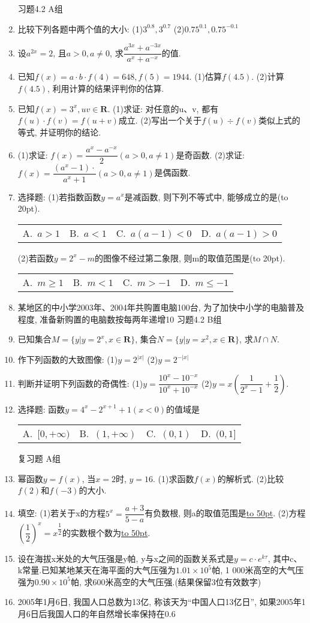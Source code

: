 \documentclass[10pt,a4paper]{article}
\newcommand{\blank}[1]{\underline{\hbox to #1pt{}}}
\newcommand{\bracket}[1]{(\hbox to #1pt{})}
\newcommand{\fourch}[4]{\par\begin{tabular}{p{.23\textwidth}p{.23\textwidth}p{.23\textwidth}p{.23\textwidth}}
A.~#1 &B.~#2& C.~#3& D.~#4
\end{tabular}}
\begin{document}
\begin{enumerate}[1.]
习题4.2  A组
\item 比较下列各题中两个值的大小:
(1)$3^{0.8},3^{0.7}$							(2)$0.75^{0.1},0.75^{-0.1}$
\item 设$a^{2x}=2$, 且$a>0,a\ne 0$, 求$\dfrac{{a^{3x}}+{a^{-3x}}}{{a^x}+{a^{-x}}}$的值.
\item 已知$f(x)=a\cdot b\cdot f(4)=648,f(5)=1944$.
(1)估算$f(4.5)$.
(2)计算$f(4.5)$, 利用计算的结果评判你的估算.
\item 已知$f(x)=3^x,uv\in \mathbf{R}$.
(1)求证: 对任意的u、v, 都有$f(u)\cdot f(v)=f(u+v)$成立.
(2)写出一个关于$f(u)\div f(v)$类似上式的等式, 并证明你的结论.
\item (1)求证: $f(x)=\dfrac{a^x-a^{-x}}2(a>0,a\ne 1)$是奇函数.
(2)求证: $f(x)=\dfrac{({a^x}-1)\cdot }{{a^x}+1}(a>0,a\ne 1)$是偶函数.
\item 选择题:
(1)若指数函数$y=a^x$是减函数, 则下列不等式中, 能够成立的是\bracket{20}.
\fourch{$a>1$}{$a<1$}{$a(a-1)<0$}{$a(a-1)>0$}
(2)若函数$y=2^x-m$的图像不经过第二象限, 则m的取值范围是\bracket{20}.
\fourch{$m\ge 1$}{$m<1$}{$m>-1$}{$m\le -1$}
\item 某地区的中小学2003年、2004年共购置电脑100台, 为了加快中小学的电脑普及程度, 准备新购置的电脑数按每两年递增10%
习题4.2  B组
\item 已知集合$M=\{y|y=2^x,x\in \mathbf{R}\}$, 集合$N=\{y|y=x^2,x\in \mathbf{R}\}$, 求$M\cap N$.
\item 作下列函数的大致图像:
(1)$y=2^{|x|}$							(2)$y=2^{-|x|}$
\item 判断并证明下列函数的奇偶性:
(1)$y=\dfrac{{{10}^x}-{{10}^{-x}}}{{{10}^x}+{{10}^{-x}}}$					(2)$y=x(\dfrac 1{2^x-1}+\dfrac 12)$.
\item 选择题:
函数$y=4^x-2^{x+1}+1(x<0)$的值域是
\fourch{$[0,+\infty)$}{$(1,+\infty)$}{$(0,1)$}{$(0,1]$}
复习题
A组
\item 幂函数$y=f(x)$, 当$x=2$时, $y=16$.
(1)求函数$f(x)$的解析式.
(2)比较$f(2)$和$f(-3)$的大小.
\item 填空:
(1)若关于x的方程$5^x=\dfrac{a+3}{5-a}$有负数根, 则a的取值范围是\blank{50}.
(2)方程$(\dfrac 12)^x=x^{\dfrac 12}$的实数根个数为\blank{50}.
\item 设在海拔x米处的大气压强是y帕, y与x之间的函数关系式是$y=c\cdot e^{k\tau }$, 其中c、k常量.已知某地某天在海平面的大气压强为$1.01\times 10^5$帕, 1 000米高空的大气压强为$0.90\times 10^5$帕, 求600米高空的大气压强.(结果保留3位有效数字)
\item 2005年1月6日, 我国人口总数为13亿, 称该天为``中国人口13亿日'', 如果2005年1月6日后我国人口的年自然增长率保持在0.6%

\end{enumerate}
\end{document}
